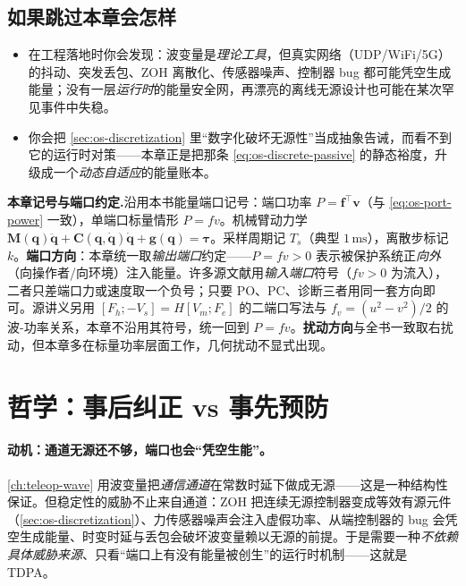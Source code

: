 \subsection*{如果跳过本章会怎样}
\begin{itemize}
  \item 在工程落地时你会发现：波变量是\emph{理论工具}，但真实网络（UDP/WiFi/5G）的抖动、突发丢包、ZOH 离散化、传感器噪声、控制器 bug 都可能凭空生成能量；没有一层\emph{运行时}的能量安全网，再漂亮的离线无源设计也可能在某次罕见事件中失稳。
  \item 你会把 \cref{sec:os-discretization} 里“数字化破坏无源性”当成抽象告诫，而看不到它的运行时对策——本章正是把那条 \cref{eq:os-discrete-passive} 的静态裕度，升级成一个\emph{动态自适应}的能量账本。
\end{itemize}

\begin{note}
\textbf{本章记号与端口约定.}\;沿用本书能量端口记号：端口功率 $P=\mathbf f^\top\mathbf v$（与 \cref{eq:os-port-power} 一致），单端口标量情形 $P=fv$。机械臂动力学 $\mathbf M(\mathbf q)\ddot{\mathbf q}+\mathbf C(\mathbf q,\dot{\mathbf q})\dot{\mathbf q}+\mathbf g(\mathbf q)=\boldsymbol\tau$。采样周期记 $T_s$（典型 $1\,\mathrm{ms}$），离散步标记 $k$。\textbf{端口方向}：本章统一取\emph{输出端口}约定——$P=fv>0$ 表示被保护系统正\emph{向外}（向操作者/向环境）注入能量。许多源文献用\emph{输入端口}符号（$fv>0$ 为流入），二者只差端口力或速度取一个负号；只要 PO、PC、诊断三者用同一套方向即可。源讲义另用 $[F_h;-V_s]=H[V_m;F_e]$ 的二端口写法与 $f_v=(u^2-v^2)/2$ 的波-功率关系，本章不沿用其符号，统一回到 $P=fv$。\textbf{扰动方向}与全书一致取右扰动，但本章多在标量功率层面工作，几何扰动不显式出现。
\end{note}

\section{哲学：事后纠正 vs 事先预防}
\label{sec:tdpa-philosophy}

\paragraph{动机：通道无源还不够，端口也会“凭空生能”。}
\cref{ch:teleop-wave} 用波变量把\emph{通信通道}在常数时延下做成无源——这是一种结构性保证。但稳定性的威胁不止来自通道：ZOH 把连续无源控制器变成等效有源元件（\cref{sec:os-discretization}）、力传感器噪声会注入虚假功率、从端控制器的 bug 会凭空生成能量、时变时延与丢包会破坏波变量赖以无源的前提。于是需要一种\emph{不依赖具体威胁来源}、只看“端口上有没有能量被创生”的运行时机制——这就是 TDPA。

